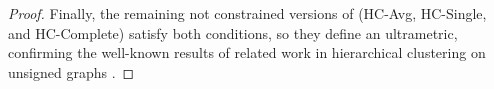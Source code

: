 \begin{proof}
Finally, the remaining not constrained versions of \algname{} (HC-Avg, HC-Single, and HC-Complete) satisfy both conditions, so they define an ultrametric, confirming the well-known results of related work in hierarchical clustering on unsigned graphs \cite{johnson1967hierarchical,milligan1979ultrametric}.







\end{proof}

